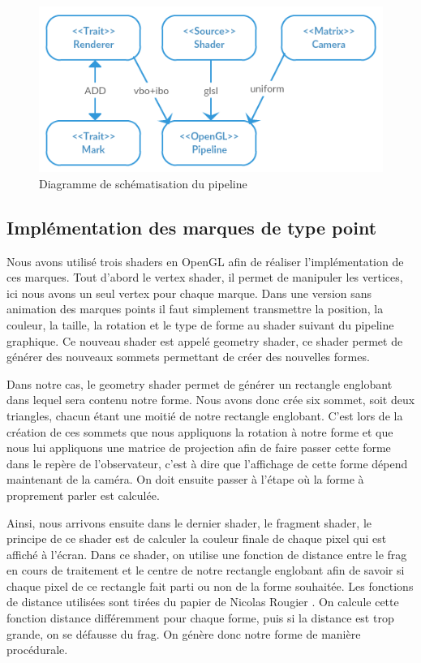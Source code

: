 \documentclass[12pt]{article}
\begin{document}
\begin{figure}[htp]
  \centering
  \includegraphics[scale=0.8]{images/pipeline}
  \caption{Diagramme de schématisation du pipeline}
  \label{fig:pipe}
\end{figure}

\subsection{Implémentation des marques de type point}

Nous avons utilisé trois shaders en OpenGL afin de réaliser l'implémentation de ces marques. Tout d'abord le vertex shader, il
permet de manipuler les vertices, ici nous avons un seul vertex pour chaque marque. Dans une version sans animation des marques
points il faut simplement transmettre la position, la couleur, la taille, la rotation et le type de forme au shader suivant du
pipeline graphique. Ce nouveau shader est appelé geometry shader, ce shader permet de générer des nouveaux sommets permettant
de créer des nouvelles formes.

Dans notre cas, le geometry shader permet de générer un rectangle englobant dans lequel sera contenu notre forme. Nous avons
donc crée six sommet, soit deux triangles, chacun étant une moitié de notre rectangle englobant. C'est lors de la création de
ces sommets que nous appliquons la rotation à notre forme et que nous lui appliquons une matrice de projection afin de faire
passer cette forme dans le repère de l'observateur, c'est à dire que l'affichage de cette forme dépend maintenant de la caméra.
On doit ensuite passer à l'étape où la forme à proprement parler est calculée.

Ainsi, nous arrivons ensuite dans le dernier shader, le fragment shader, le principe de ce shader est de calculer la couleur
finale de chaque pixel qui est affiché à l'écran. Dans ce shader, on utilise une fonction de distance entre le \gls{frag} en
cours de traitement et le centre de notre rectangle englobant afin de savoir si chaque pixel de ce rectangle fait parti ou non
de la forme souhaitée. Les fonctions de distance utilisées sont tirées du papier de Nicolas Rougier \cite{Rougier}. On calcule
cette fonction distance différemment pour chaque forme, puis si la distance est trop grande, on se défausse du \gls{frag}. On
génère donc notre forme de manière procédurale.
\end{document}
